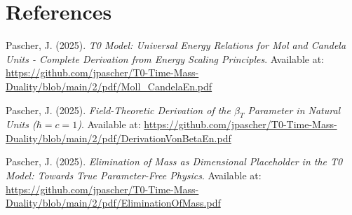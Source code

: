 \documentclass[12pt,a4paper]{article}
\begin{document}
\section*{References}
\label{sec:references}

\begin{thebibliography}{9}
	
	Pascher, J. (2025). \textit{T0 Model: Universal Energy Relations for Mol and Candela Units - Complete Derivation from Energy Scaling Principles}. Available at: \url{https://github.com/jpascher/T0-Time-Mass-Duality/blob/main/2/pdf/Moll_CandelaEn.pdf}
	
	Pascher, J. (2025). \textit{Field-Theoretic Derivation of the $\beta_T$ Parameter in Natural Units ($\hbar = c = 1$)}. Available at: \url{https://github.com/jpascher/T0-Time-Mass-Duality/blob/main/2/pdf/DerivationVonBetaEn.pdf}
	
	Pascher, J. (2025). \textit{Elimination of Mass as Dimensional Placeholder in the T0 Model: Towards True Parameter-Free Physics}. Available at: \url{https://github.com/jpascher/T0-Time-Mass-Duality/blob/main/2/pdf/EliminationOfMass.pdf}
	
\end{thebibliography}	
\end{document}
